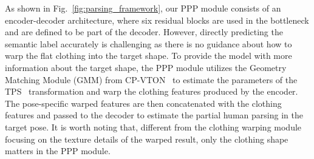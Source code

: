 \documentclass[sigconf]{acmart}
\begin{document}
As shown in Fig.~\ref{fig:parsing_framework}, our PPP module consists of an encoder-decoder architecture, where six residual blocks are used in the bottleneck and are defined to be part of the decoder. 
However, directly predicting the semantic label accurately is challenging as there is no guidance about how to warp the flat clothing into the target shape. 
To provide the model with more information about the target shape, the PPP module utilizes the Geometry Matching Module (GMM) from CP-VTON~\cite{bochao2018cpvton} to estimate the parameters of the TPS~\cite{bookstein1989TPS} transformation and warp the clothing features produced by the encoder. The pose-specific warped features are then concatenated with the clothing features and passed to the decoder to estimate the partial human parsing in the target pose.
It is worth noting that, different from the clothing warping module focusing on the texture details of the warped result, only the clothing shape matters in the PPP module.
\end{document}
